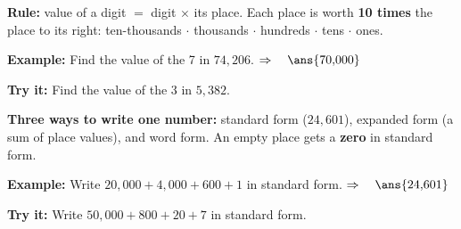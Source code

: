 \documentclass[12pt]{article}
\begin{document}


\begin{formulabox}
\textbf{Rule:} value of a digit $=$ digit $\times$ its place. Each place is
worth \textbf{10 times} the place to its right:
ten-thousands $\cdot$ thousands $\cdot$ hundreds $\cdot$ tens $\cdot$ ones.
\end{formulabox}

\begin{examplebox}
\textbf{Example:} \quad Find the value of the 7 in $74{,}206$.
$\Rightarrow\quad \ans{70{,}000}$
\end{examplebox}

\begin{tryitbox}
\textbf{Try it:} \quad Find the value of the 3 in $5{,}382$.\\[2pt]
\end{tryitbox}


\begin{formulabox}
\textbf{Three ways to write one number:} standard form ($24{,}601$), expanded
form (a sum of place values), and word form. An empty place gets a \textbf{zero}
in standard form.
\end{formulabox}

\begin{examplebox}
\textbf{Example:} \quad Write $20{,}000 + 4{,}000 + 600 + 1$ in standard form.
$\Rightarrow\quad \ans{24{,}601}$
\end{examplebox}

\begin{tryitbox}
\textbf{Try it:} \quad Write $50{,}000 + 800 + 20 + 7$ in standard form.\\[2pt]
\end{tryitbox}

\end{document}

